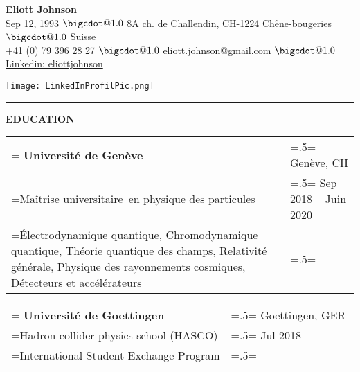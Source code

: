 \documentclass[letterpaper, 11pt]{article}
\makeatletter
\newcommand*\bigcdot{\mathpalette\bigcdot@{1.0}}
\newcommand*\bigcdot@[2]{\mathbin{\vcenter{\hbox{\scalebox{#2}{$\m@th#1\bullet$}}}}}
\makeatother
\begin{document}
\setlength\parindent{0pt}\textbf{}

\hfill%
\begin{minipage}{0.79\textwidth}\flushleft
\huge{\bf{Eliott Johnson}}\\
\normalsize
Sep 12, 1993 $\bigcdot$ 8A ch. de Challendin, CH-1224 Chêne-bougeries $\bigcdot$ Suisse \\
+41 (0) 79 396 28 27 $\bigcdot$  \href{mailto:eliott.johnson@gmail.com}{eliott.johnson@gmail.com} $\bigcdot$  \href{https://www.linkedin.com/in/eliottjohnson/}{Linkedin: eliottjohnson}
\end{minipage}
\begin{minipage}{0.19\textwidth}%
\texttt{[image: LinkedInProfilPic.png]}
\end{minipage}%
\vspace{0.25cm}

\noindent\rule{\textwidth}{1pt}

\begin{center}
\large\bf{EDUCATION}
\end{center}

\begin{tabularx}{1.0\textwidth} { 
   >{\raggedright\arraybackslash\hsize=1.5\hsize\linewidth=\hsize}X 
   >{\raggedleft\arraybackslash\hsize=.5\hsize\linewidth=\hsize}X }
\normalsize
\bf{Université de Genève} & Genève, CH \\
\normalfont Maîtrise universitaire\ en physique des particules & Sep 2018 -- Juin 2020  \\  
Électrodynamique quantique, Chromodynamique quantique, Théorie quantique des champs, Relativité générale, Physique des rayonnements cosmiques, Détecteurs et accélérateurs &
\end{tabularx}
\vspace{0.25cm}

\begin{tabularx}{1.0\textwidth} { 
   >{\raggedright\arraybackslash\hsize=1.5\hsize\linewidth=\hsize}X 
   >{\raggedleft\arraybackslash\hsize=.5\hsize\linewidth=\hsize}X }
\normalsize
\bf{Université de Goettingen} & Goettingen, GER \\
\normalfont Hadron collider physics school (HASCO) & Jul 2018 \\
International Student Exchange Program
\end{tabularx}
\vspace{0.25cm}
\end{document}
